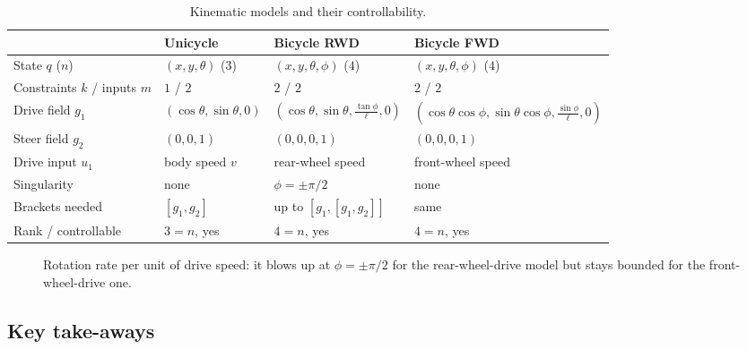 \documentclass[11pt,a4paper]{article}
\newcommand{\LB}[2]{[#1,#2]}
\theoremstyle{plain}
\theoremstyle{definition}
\theoremstyle{remark}
\begin{document}
\begin{table}[ht]
\centering
\footnotesize
\setlength{\tabcolsep}{4pt}
\renewcommand{\arraystretch}{1.35}
\begin{tabular}{@{}p{2.6cm}p{3.0cm}p{3.7cm}p{4.3cm}@{}}
\toprule
 & \textbf{Unicycle} & \textbf{Bicycle RWD} & \textbf{Bicycle FWD}\\
\midrule
State $q$ ($n$) & $(x,y,\theta)$ ($3$) & $(x,y,\theta,\phi)$ ($4$) & $(x,y,\theta,\phi)$ ($4$)\\
Constraints $k$ / inputs $m$ & $1$ / $2$ & $2$ / $2$ & $2$ / $2$\\
Drive field $g_1$ & $(\cos\theta,\sin\theta,0)$ & $(\cos\theta,\sin\theta,\tfrac{\tan\phi}\ell,0)$ & $(\cos\theta\cos\phi,\sin\theta\cos\phi,\tfrac{\sin\phi}\ell,0)$\\
Steer field $g_2$ & $(0,0,1)$ & $(0,0,0,1)$ & $(0,0,0,1)$\\
Drive input $u_1$ & body speed $v$ & rear-wheel speed & front-wheel speed\\
Singularity & none & $\phi=\pm\pi/2$ & none\\
Brackets needed & $\LB{g_1}{g_2}$ & up to $\LB{g_1}{\LB{g_1}{g_2}}$ & same\\
Rank / controllable & $3=n$, yes & $4=n$, yes & $4=n$, yes\\
\bottomrule
\end{tabular}
\caption{Kinematic models and their controllability.}
\end{table}

\begin{figure}[H]
\centering
{}
\caption{Rotation rate per unit of drive speed: it blows up at $\phi=\pm\pi/2$ for the rear-wheel-drive model but stays bounded for the front-wheel-drive one.}
\end{figure}

\subsection{Key take-aways}
\end{document}
